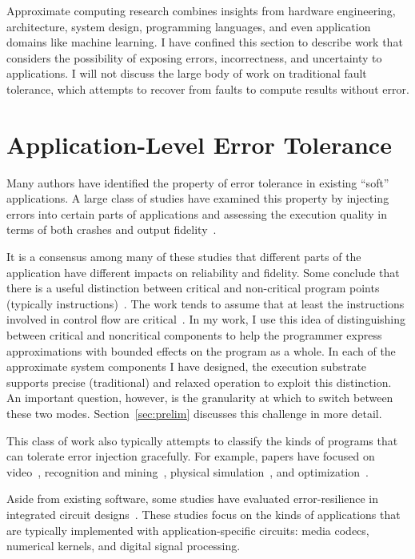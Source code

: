 Approximate computing research combines insights from hardware engineering,
architecture, system design, programming languages, and even application
domains like machine learning. I have confined this section to describe work
that considers the possibility of exposing errors, incorrectness, and
uncertainty to applications. I will not discuss the large body of work on
traditional fault tolerance, which attempts to recover from faults to compute
results without error.

\section{Application-Level Error Tolerance}
\label{sec:related:studies}

Many authors have identified the property of error tolerance in existing
``soft''
applications. A large class of studies have examined this property by
injecting errors into certain parts of applications and assessing the
execution quality in terms of both crashes and output fidelity~\cite{li06,
li07, li08, dekruijf-selse09, wong-selse06, palem-arcs, freton, besteffort,
yeh, thaker-iiswc06, efc, llfi}.

It is a consensus among many of these studies that different parts of the
application have different impacts on reliability and fidelity. Some conclude
that there is a useful distinction between critical and non-critical program
points (typically instructions)~\cite{palem-arcs, thaker-iiswc06, flikker,
llfi}.
The work tends to assume that at least the instructions involved in control
flow are critical~\cite{thaker-iiswc06}. In my work, I use this idea of
distinguishing between critical and noncritical components to help the
programmer express approximations with bounded effects on the program as a
whole. In each of the approximate system components I have designed, the
execution substrate supports precise (traditional) and relaxed operation to
exploit this distinction. An important question, however, is the granularity
at which to switch between these two modes. Section~\ref{sec:prelim} discusses
this challenge in more detail.

This class of work also typically attempts to classify the kinds of programs
that can tolerate error injection gracefully. For example, papers have focused
on video~\cite{freton}, recognition and mining~\cite{besteffort}, physical
simulation~\cite{yeh}, and optimization~\cite{hogwild}.

Aside from existing software, some studies have evaluated error-resilience in
integrated circuit designs~\cite{breuer, scalable-effort-hardware}. These
studies focus on the kinds of applications that are typically implemented with
application-specific circuits: media codecs, numerical kernels, and digital
signal processing.


